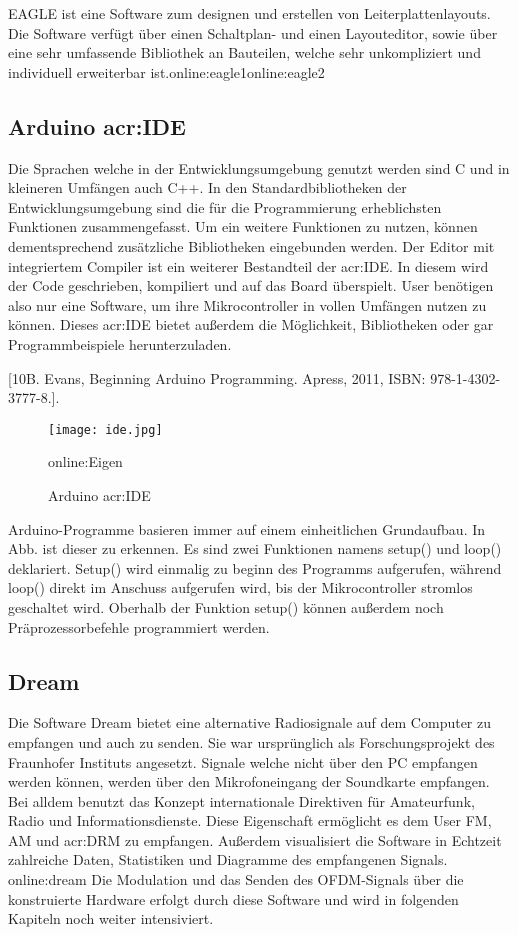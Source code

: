 EAGLE ist eine Software zum designen und erstellen von Leiterplattenlayouts. Die Software verfügt über einen Schaltplan- und einen Layouteditor, sowie über eine sehr umfassende Bibliothek an Bauteilen, welche sehr unkompliziert und individuell erweiterbar ist.\gls{online:eagle1}\gls{online:eagle2}

\subsection{Arduino \gls{acr:IDE}}
\label{subsec:Unterabschnitt12}

Die Sprachen welche in der Entwicklungsumgebung genutzt werden sind C und in kleineren Umfängen auch C++. In den Standardbibliotheken der Entwicklungsumgebung sind die für die Programmierung erheblichsten Funktionen zusammengefasst. Um ein weitere Funktionen zu nutzen, können dementsprechend zusätzliche Bibliotheken eingebunden werden. 
Der Editor mit integriertem Compiler ist ein weiterer Bestandteil der \gls{acr:IDE}. In diesem wird der Code geschrieben, kompiliert und auf das Board überspielt. User benötigen also nur eine Software, um ihre Mikrocontroller in vollen Umfängen nutzen zu können. Dieses \gls{acr:IDE} bietet außerdem die Möglichkeit, Bibliotheken oder gar Programmbeispiele herunterzuladen. 

[10B. Evans, Beginning Arduino Programming. Apress, 2011, ISBN: 978-1-4302-
3777-8.].

\begin{figure}[H]
	\centering
	\texttt{[image: ide.jpg]}
	\caption[Arduino \gls{acr:IDE}]{Arduino \gls{acr:IDE}}\gls{online:Eigen}
	\label{fig:ide}
\end{figure}


Arduino-Programme basieren immer auf einem einheitlichen Grundaufbau. In Abb. ist
dieser zu erkennen. Es sind zwei Funktionen namens setup() und loop() deklariert.
Setup() wird einmalig zu beginn des Programms aufgerufen, während loop() direkt im Anschuss aufgerufen wird, bis der Mikrocontroller stromlos geschaltet wird. Oberhalb der Funktion setup() können außerdem noch Präprozessorbefehle programmiert werden.

\subsection{Dream}
\label{subsec:Unterabschnitt12}
Die Software Dream bietet eine alternative Radiosignale auf dem Computer zu empfangen und auch zu senden. Sie war ursprünglich als Forschungsprojekt des Fraunhofer Instituts angesetzt. Signale welche nicht über den PC empfangen werden können, werden über den Mikrofoneingang der Soundkarte empfangen.
Bei alldem benutzt das Konzept internationale Direktiven für Amateurfunk, Radio und Informationsdienste.
Diese Eigenschaft ermöglicht es dem User FM, AM und \gls{acr:DRM} zu empfangen. Außerdem visualisiert die Software in Echtzeit zahlreiche Daten, Statistiken und Diagramme des empfangenen Signals. \gls{online:dream} Die Modulation und das Senden des OFDM-Signals über die konstruierte Hardware erfolgt durch diese Software und wird in folgenden Kapiteln noch weiter intensiviert.